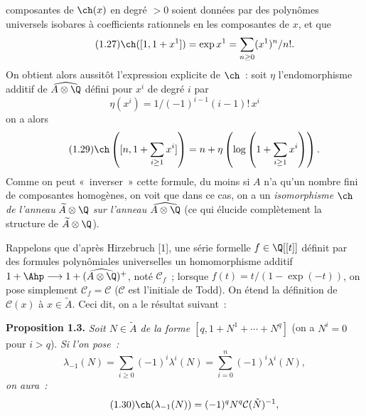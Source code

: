 composantes de $\ch(x)$ en degré $>0$ soient données par des polynômes universels isobares à coefficients rationnels en les composantes de $x$, et que
\begin{equation}\tag{1.27}
\ch([1,1+x^1])=\exp x^1=\sum_{n\geq0}(x^1)^n/n!.
\end{equation}
On obtient alors aussitôt l'expression explicite de $\ch$~: soit $\eta$ l'endomorphisme additif de $\widehat{A\otimes\Q}$ défini pour $x^i$ de degré $i$ par
\begin{equation}\tag{1.28}
\eta(x^i)=1/(-1)^{i-1}(i-1)!\,x^i
\end{equation}
on a alors
\begin{equation}\tag{1.29}
\ch\left([n,1+\sum_{i\geq1}x^i]\right)=n+\eta\left(\log\left(1+\sum_{i\geq1}x^i\right)\right).
\end{equation}
Comme on peut «~inverser~» cette formule, du moins si $A$ n'a qu'un nombre fini de composantes homogènes, on voit que dans ce cas, on a un \emph{isomorphisme} $\ch$ \emph{de l'anneau} $\widetilde A\otimes\Q$ \emph{sur l'anneau} $\widehat{A\otimes\Q}$ (ce qui élucide complètement la structure de $\widetilde A\otimes\Q$).

Rappelons que d'après Hirzebruch [1], une série formelle $f\in\Q[[t]]$ définit par des formules polynômiales universelles un homomorphisme additif $1+\Ahp\longrightarrow 1+(\widehat{A\otimes\Q})^+$, noté $\mathcal C_f$~; lorsque $f(t)=t/(1-\exp(-t))$, on pose simplement $\mathcal C_f=\mathcal C$ ($\mathcal C$ est l'initiale de Todd). On étend la définition de $\mathcal C(x)$ à $x\in\widetilde A$. Ceci dit, on a le résultat suivant~:

\textbf{Proposition 1.3.} \emph{Soit $N\in\widetilde A$ de la forme $[q,1+N^1+\cdots+N^q]$} (on a $N^i=0$ pour $i>q$). \emph{Si l'on pose~:}
\[
\lambda_{-1}(N)=\sum_{i\geq0}(-1)^i\lambda^i(N)=\sum_{i=0}^{n}(-1)^i\lambda^i(N),
\]
\emph{on aura~:}
\begin{equation}\tag{1.30}
\ch(\lambda_{-1}(N))=(-1)^q N^q\mathcal C(\check N)^{-1},
\end{equation}
